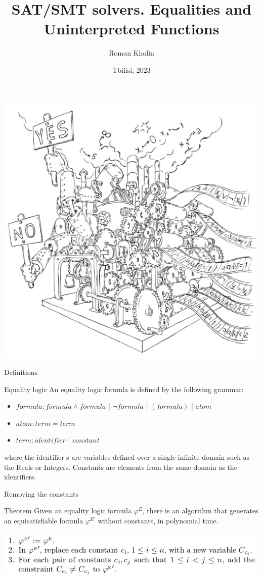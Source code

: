 \documentclass{beamer}
\begin{document}
\title{SAT/SMT solvers. Equalities and Uninterpreted Functions}
\author{Roman Kholin}
\date{Tbilisi, 2023}

\begin{frame}
\includegraphics[scale=0.5]{../decision-procedure.png}
\end{frame}

\frame{\titlepage}

\begin{frame}{Definitions}
\begin{block}{Equality logic}
An equality logic formula is defined by the following grammar:
\begin{itemize}
\item $formula: formula \wedge formula$ | $\lnot formula$ | $(formula)$ | $atom$
\item $atom : term = term$
\item $term : identifier$ | $constant$
\end{itemize}
where the identifier s are variables defined over a single infinite domain such as the Reals or Integers. Constants are elements from the same domain as the identifiers.
\end{block}
\end{frame}

\begin{frame}{Removing the constants}
\begin{block}{Theorem}
Given an equality logic formula $\varphi^E$, there is an algorithm that generates an equisatisfiable formula $\varphi^{E'}$ without constants, in polynomial time.
\end{block}
\includegraphics[scale=0.5]{Removing_constants.png}
\end{frame}
\end{document}
